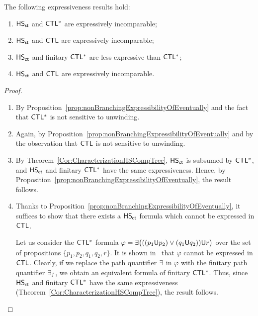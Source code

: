 \begin{corollary}
The following expressiveness results hold:
\begin{enumerate}
\item $\text{\sffamily HS}_{\mathsf{st}}$ and $\text{\sffamily CTL$^{*}$}$ are expressively incomparable;
\item $\text{\sffamily HS}_{\mathsf{st}}$ and $\text{\sffamily CTL}$ are expressively incomparable;
\item $\text{\sffamily HS}_{\mathsf{ct}}$ and finitary $\text{\sffamily CTL$^{*}$}$ are  less expressive than $\text{\sffamily CTL$^{*}$}$;
\item  $\text{\sffamily HS}_{\mathsf{ct}}$ and $\text{\sffamily CTL}$ are expressively incomparable.
\end{enumerate}
\end{corollary}
\begin{proof}
\begin{enumerate}
\item By Proposition~\ref{prop:nonBranchingExpressibilityOfEventually} and the fact that  $\text{\sffamily CTL$^{*}$}$ is not sensitive to unwinding. %

\item Again, by Proposition~\ref{prop:nonBranchingExpressibilityOfEventually} and by the observation that $\text{\sffamily CTL}$ is not sensitive to unwinding.

\item By Theorem~\ref{Cor:CharacterizationHSCompTree},  $\text{\sffamily HS}_{\mathsf{ct}}$ is subsumed by $\text{\sffamily CTL$^{*}$}$, and $\text{\sffamily HS}_{\mathsf{ct}}$ and finitary $\text{\sffamily CTL$^{*}$}$ have the same expressiveness. %
Hence, by Proposition~\ref{prop:nonBranchingExpressibilityOfEventually}, the result follows.

\item Thanks to Proposition~\ref{prop:nonBranchingExpressibilityOfEventually}, it suffices to show that there exists a
$\text{\sffamily HS}_{\mathsf{ct}}$ formula which cannot be expressed in $\text{\sffamily CTL}$. 

Let us consider the $\text{\sffamily CTL$^{*}$}$ formula
$\varphi= \exists\bigl(((p_1 \textsf{U} p_2) \vee (q_1 \textsf{U} q_2)) \textsf{U} r\bigr)$
over the set of propositions $\{p_1,p_2,q_1,q_2,r\}$. It is shown in~\cite{EH86} that $\varphi$
cannot be expressed in $\text{\sffamily CTL}$. Clearly, if
we replace the path quantifier $\exists$ in $\varphi$ with the finitary path quantifier $\exists_f$,  we obtain an equivalent formula of finitary $\text{\sffamily CTL$^{*}$}$.
Thus, since $\text{\sffamily HS}_{\mathsf{ct}}$ and finitary $\text{\sffamily CTL$^{*}$}$ have the same expressiveness (Theorem~\ref{Cor:CharacterizationHSCompTree}),
the result follows.\qedhere
\end{enumerate}
\end{proof}


